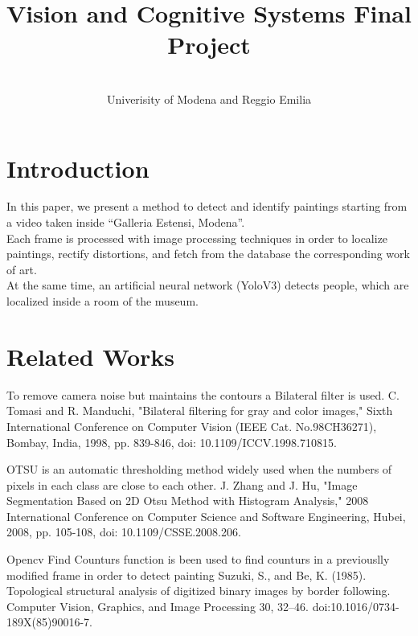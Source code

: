\documentclass[conference]{IEEEtran}
\begin{document}
\title{Vision and Cognitive Systems Final Project}
\author{
\and
{}
\\
\large{Univerisity of Modena and Reggio Emilia}
\and
{}
}
\maketitle


\section{Introduction}
In this paper, we present a method to detect and identify paintings starting from a video taken inside “Galleria Estensi, Modena”.\\
Each frame is processed with image processing techniques in order to localize paintings, rectify distortions, and fetch from the database the corresponding work of art.\\
At the same time, an artificial neural network (YoloV3) detects people, which are localized inside a room of the museum.

\section{Related Works}
To remove camera noise but maintains the contours a  Bilateral filter is used.
C. Tomasi and R. Manduchi, "Bilateral filtering for gray and color images," Sixth International Conference on Computer Vision (IEEE Cat. No.98CH36271), Bombay, India, 1998, pp. 839-846, doi: 10.1109/ICCV.1998.710815.

OTSU is an automatic thresholding method widely used when the numbers of pixels in each class are close to each other.
J. Zhang and J. Hu, "Image Segmentation Based on 2D Otsu Method with Histogram Analysis," 2008 International Conference on Computer Science and Software Engineering, Hubei, 2008, pp. 105-108, doi: 10.1109/CSSE.2008.206.

Opencv Find Counturs function is been used to find counturs in a previouslly modified frame in order to detect painting
Suzuki, S., and Be, K. (1985). Topological structural analysis of digitized binary images by border following. Computer Vision, Graphics, and Image Processing 30, 32–46. doi:10.1016/0734-189X(85)90016-7.
\end{document}
